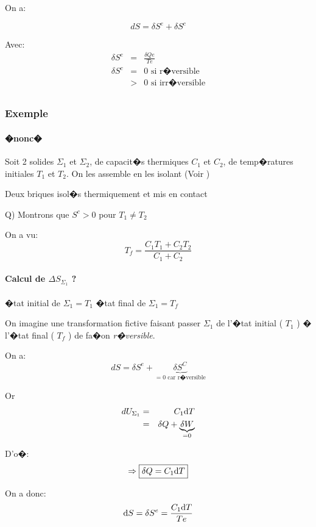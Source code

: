 On a:

\[
 dS = \delta S^e + \delta S^c
\]

Avec:
\begin{eqnarray*}
	\delta S^e 	& = & \frac{\delta Qe}{Te}\\
	\delta S^c 	& = & 0 \mbox{ si r�versible} \\
		     	& > & 0 \mbox{ si irr�versible} \\
\end{eqnarray*}

\subsubsection{Exemple}

\paragraph{�nonc�}

Soit 2 solides $ \Sigma_1 $ et $ \Sigma_2 $, de capacit�s thermiques $ C_1 $ et $ C_2 $, de temp�ratures initiales $ T_1 $ et $ T_2 $.
On les assemble en les isolant (Voir )

		{Deux briques isol�s thermiquement et mis en contact}

Q) Montrons que $ S^c > 0 $ pour $ T_1 \neq  T_2 $

On a vu: 
\[
 T_f = \frac{C_1 T_1 + C_2 T_2}{C_1 + C_2}
\]

\paragraph{Calcul de $\Delta S_{\Sigma_1}$ ?}
�tat initial de $ \Sigma_1 = T_1 $
�tat final de $ \Sigma_1 = T_f $

On imagine une transformation fictive faisant passer $ \Sigma_1 $ de l'�tat initial ( $ T_1 $ ) � l'�tat final ( $ T_f $ ) de fa�on \emph{r�versible}.

On a: 
\[
	dS = \delta S^e + \underbrace{\delta S^C}_{ = 0 \text{ car r�versible}}
\]

Or
\begin{eqnarray*}
	dU_{\Sigma_1}	& = & C_1 \mathrm{d} T \\
	   			& = & \delta Q + \underbrace{\delta W}_{ = 0}
\end{eqnarray*}

D'o�:
\[
 \Rightarrow \boxed{\delta Q = C_1 \mathrm{d} T}
\]

On a donc:
\[
	\mathrm{d} S = \delta S^e = \frac{C_1 \mathrm{d} T}{Te}
\]

